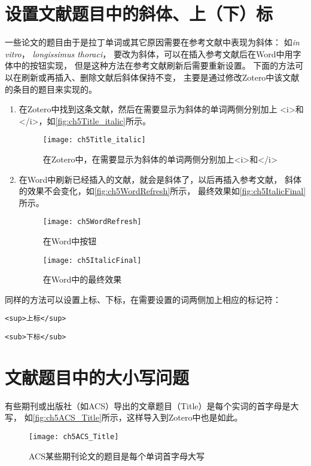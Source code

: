 \documentclass[cn,11pt,chinese]{elegantbook}
\begin{document}
		\section{设置文献题目中的斜体、上（下）标}\label{sec:italic}
			一些论文的题目由于是拉丁单词或其它原因需要在参考文献中表现为斜体：
			如\textit{in vitro}， \textit{longissimus thoraci}，
			要改为斜体，可以在插入参考文献后在Word中用字体中的按钮实现，
			但是这种方法在参考文献刷新后需要重新设置。
			下面的方法可以在刷新或再插入、删除文献后斜体保持不变，
			主要是通过修改Zotero中该文献的条目的题目来实现的。
				\begin{enumerate}
					\item 在Zotero中找到这条文献，然后在需要显示为斜体的单词两侧分别加上
					<i>和</i>，如\autoref{fig:ch5Title_italic}所示。
						\begin{figure}[htbp]
							\centering
							\texttt{[image: ch5Title\_italic]}
							\caption{在Zotero中，在需要显示为斜体的单词两侧分别加上<i>和</i>}
							\label{fig:ch5Title_italic}
						\end{figure}
					\item 在Word中刷新已经插入的文献，就会是斜体了，以后再插入参考文献，
					斜体的效果不会变化，如\autoref{fig:ch5WordRefresh}所示，
					最终效果如\autoref{fig:ch5ItalicFinal}所示。
						\begin{figure}[htbp]
							\centering
							\texttt{[image: ch5WordRefresh]}
							\caption{在Word中按钮}
							\label{fig:ch5WordRefresh}
						\end{figure}
						\begin{figure}[htbp]
							\centering
							\texttt{[image: ch5ItalicFinal]}
							\caption{在Word中的最终效果}
							\label{fig:ch5ItalicFinal}
						\end{figure}
				\end{enumerate}
			\vspace{1em}
			
			同样的方法可以设置上标、下标，在需要设置的词两侧加上相应的标记符：
					
			\verb|<sup>上标</sup> |	
			
			\verb|<sub>下标</sub> |


		\section{文献题目中的大小写问题}\label{sec:case}
			有些期刊或出版社（如ACS）导出的文章题目（Title）是每个实词的首字母是大写，
			如\autoref{fig:ch5ACS_Title}所示，这样导入到Zotero中也是如此。
				\begin{figure}[htbp]
					\centering
					\texttt{[image: ch5ACS\_Title]}
					\caption{ACS某些期刊论文的题目是每个单词首字母大写}
					\label{fig:ch5ACS_Title}
				\end{figure}	
			
\end{document}
